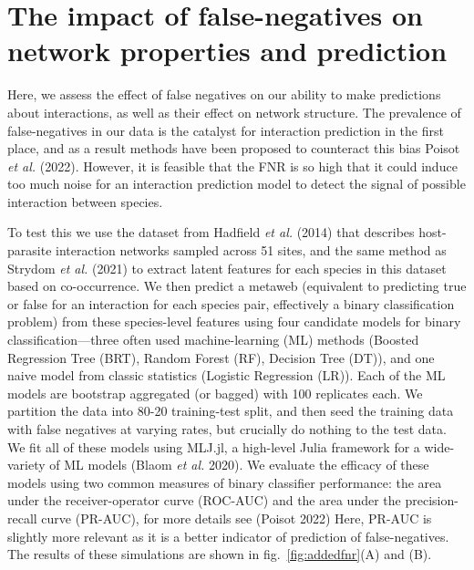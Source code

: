 \documentclass[11pt]{article}
\begin{document}
\hypertarget{the-impact-of-false-negatives-on-network-properties-and-prediction}{%
\section{The impact of false-negatives on network properties and
prediction}\label{the-impact-of-false-negatives-on-network-properties-and-prediction}}

Here, we assess the effect of false negatives on our ability to make
predictions about interactions, as well as their effect on network
structure. The prevalence of false-negatives in our data is the catalyst
for interaction prediction in the first place, and as a result methods
have been proposed to counteract this bias Poisot \emph{et al.} (2022).
However, it is feasible that the FNR is so high that it could induce too
much noise for an interaction prediction model to detect the signal of
possible interaction between species.

To test this we use the dataset from Hadfield \emph{et al.} (2014) that
describes host-parasite interaction networks sampled across 51 sites,
and the same method as Strydom \emph{et al.} (2021) to extract latent
features for each species in this dataset based on co-occurrence. We
then predict a metaweb (equivalent to predicting true or false for an
interaction for each species pair, effectively a binary classification
problem) from these species-level features using four candidate models
for binary classification---three often used machine-learning (ML)
methods (Boosted Regression Tree (BRT), Random Forest (RF), Decision
Tree (DT)), and one naive model from classic statistics (Logistic
Regression (LR)). Each of the ML models are bootstrap aggregated (or
bagged) with 100 replicates each. We partition the data into 80-20
training-test split, and then seed the training data with false
negatives at varying rates, but crucially do nothing to the test data.
We fit all of these models using MLJ.jl, a high-level Julia framework
for a wide-variety of ML models (Blaom \emph{et al.} 2020). We evaluate
the efficacy of these models using two common measures of binary
classifier performance: the area under the receiver-operator curve
(ROC-AUC) and the area under the precision-recall curve (PR-AUC), for
more details see (Poisot 2022) Here, PR-AUC is slightly more relevant as
it is a better indicator of prediction of false-negatives. The results
of these simulations are shown in fig.~\ref{fig:addedfnr}(A) and (B).
\end{document}
